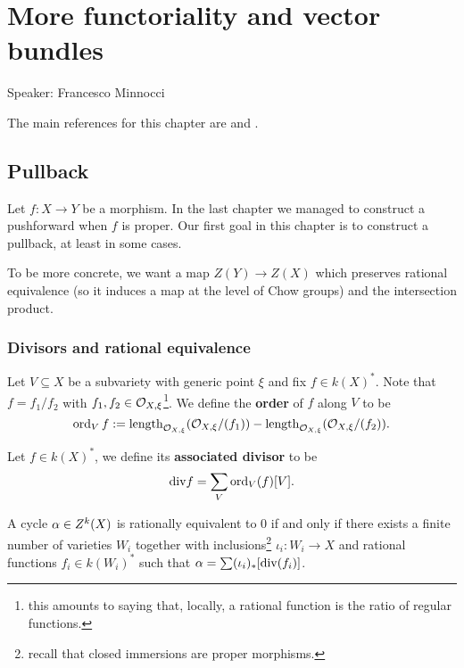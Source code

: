 \chapter{More functoriality and vector bundles}
\begin{center}
	{\huge Speaker: Francesco Minnocci}
\end{center}
\bigskip

\noindent
The main references for this chapter are \cite{fulton1984intersection} and \cite{eisenbud20163264}. 



\section{Pullback}

Let $f:X\to Y$ be a morphism. In the last chapter we managed to construct a pushforward when $f$ is proper. Our first goal in this chapter is to construct a pullback, at least in some cases.


To be more concrete, we want a map $Z(Y)\to Z(X)$ which preserves rational equivalence (so it induces a map at the level of Chow groups) and the intersection product.

\subsection{Divisors and rational equivalence}
\begin{definition}[]
Let $V\subseteq X$ be a subvariety with generic point $\xi$ and fix $f\in k(X)^\ast$. Note that $f=f_1/f_2$ with $f_1,f_2\in \mathcal{O}_{X,\xi}$\footnote{this amounts to saying that, locally, a rational function is the ratio of regular functions.}. We define the \textbf{order} of $f$ along $V$ to be
\[\operatorname{ord}_Vf:=\operatorname{length}_{\mathcal{O}_{X,\xi}}(\mathcal{O}_{X,\xi}/(f_1))-\operatorname{length}_{\mathcal{O}_{X,\xi}}(\mathcal{O}_{X,\xi}/(f_2)).\]
\end{definition}


\begin{definition}[]
Let $f\in k(X)^\ast$, we define its \textbf{associated divisor} to be
\[\mathrm{div} f=\sum_V\operatorname{ord}_V(f)[V].\]
\end{definition}


\begin{proposition}[]
A cycle $\alpha\in Z^k(X)$ is rationally equivalent to $0$ if and only if there exists a finite number of varieties $W_i$ together with inclusions\footnote{recall that closed immersions are proper morphisms.} $\iota_i:W_i\to X$ and rational functions $f_i\in k(W_i)^\ast$ such that $\alpha=\sum (\iota_i)_\ast[\mathrm{div}(f_i)]$.
\end{proposition}

